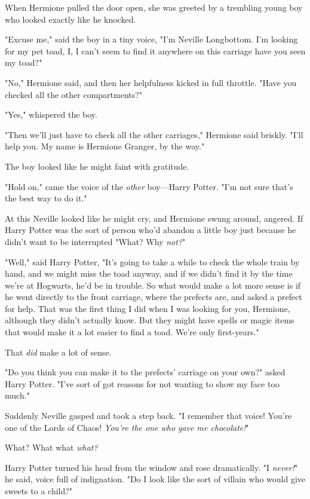 When Hermione pulled the door open, she was greeted by a trembling young boy
who looked exactly like he knocked.

"Excuse me," said the boy in a tiny voice, "I'm Neville Longbottom. I'm looking
for my pet toad, I, I can't seem to find it anywhere on this carriage{\el}
have you seen my toad?"

"No," Hermione said, and then her helpfulness kicked in full throttle. "Have
you checked all the other compartments?"

"Yes," whispered the boy.

"Then we'll just have to check all the other carriages," Hermione said briskly.
"I'll help you. My name is Hermione Granger, by the way."

The boy looked like he might faint with gratitude.

"Hold on," came the voice of the \emph{other} boy---Harry Potter. "I'm not sure
that's the best way to do it."

At this Neville looked like he might cry, and Hermione swung around, angered.
If Harry Potter was the sort of person who'd abandon a little boy just because
he didn't want to be interrupted{\el} "What? Why \emph{not?}"

"Well," said Harry Potter, "It's going to take a while to check the whole train
by hand, and we might miss the toad anyway, and if we didn't find it by the
time we're at Hogwarts, he'd be in trouble. So what would make a lot more sense
is if he went directly to the front carriage, where the prefects are, and asked
a prefect for help. That was the first thing I did when I was looking for you,
Hermione, although they didn't actually know. But they might have spells or
magic items that would make it a lot easier to find a toad. We're only
first-years."

That{\el} \emph{did} make a lot of sense.

"Do you think you can make it to the prefects' carriage on your own?" asked
Harry Potter. "I've sort of got reasons for not wanting to show my face too
much."

Suddenly Neville gasped and took a step back. "I remember that voice! You're
one of the Lords of Chaos! \emph{You're the one who gave me chocolate!}"

What? What what \emph{what?}

Harry Potter turned his head from the window and rose dramatically. "I
\emph{never!}" he said, voice full of indignation. "Do I look like the sort of
villain who would give sweets to a child?"

